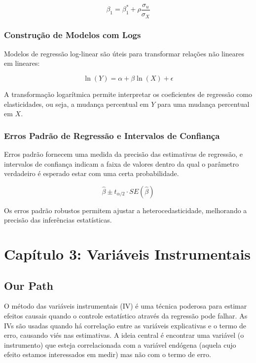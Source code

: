 \documentclass[a4paper,12pt]{article}[abntex2]
\begin{document}
\begin{equation}
    \beta_{1} = \beta_{1}^* + \rho \frac{\sigma_{u}}{\sigma_{X}}
\end{equation}

\subsubsection*{Construção de Modelos com Logs}

Modelos de regressão log-linear são úteis para transformar relações não lineares em lineares:

\begin{equation}
    \ln(Y) = \alpha + \beta \ln(X) + \epsilon
\end{equation}

A transformação logarítmica permite interpretar os coeficientes de regressão como elasticidades, ou seja, a mudança percentual em \(Y\) para uma mudança percentual em \(X\).

\subsubsection*{Erros Padrão de Regressão e Intervalos de Confiança}

Erros padrão fornecem uma medida da precisão das estimativas de regressão, e intervalos de confiança indicam a faixa de valores dentro da qual o parâmetro verdadeiro é esperado estar com uma certa probabilidade.

\begin{equation}
    \hat{\beta} \pm t_{\alpha/2} \cdot SE(\hat{\beta})
\end{equation}

Os erros padrão robustos permitem ajustar a heterocedasticidade, melhorando a precisão das inferências estatísticas.

\newpage

\section{Capítulo 3: Variáveis Instrumentais}

\subsection*{Our Path}

O método das variáveis instrumentais (IV) é uma técnica poderosa para estimar efeitos causais quando o controle estatístico através da regressão pode falhar. As IVs são usadas quando há correlação entre as variáveis explicativas e o termo de erro, causando viés nas estimativas. A ideia central é encontrar uma variável (o instrumento) que esteja correlacionada com a variável endógena (aquela cujo efeito estamos interessados em medir) mas não com o termo de erro.
\end{document}

